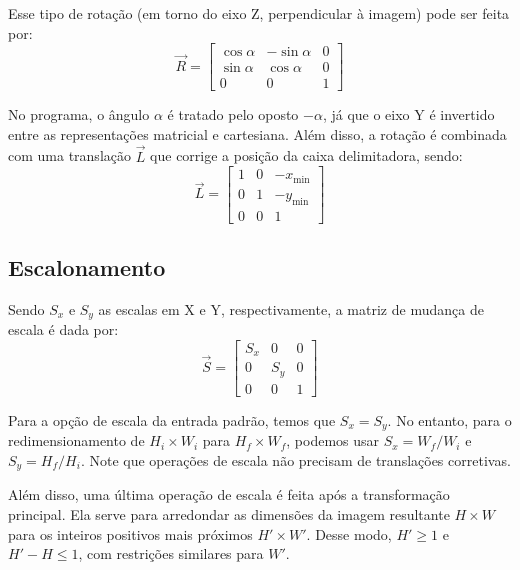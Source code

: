     Esse tipo de rotação (em torno do eixo Z, perpendicular à imagem) pode ser feita por:
    \[
        \vec{R} = \begin{bmatrix}
            \cos\alpha & -\sin\alpha & 0 \\
            \sin\alpha & \cos\alpha & 0 \\
            0 & 0 & 1
        \end{bmatrix}
    \]

    No programa, o ângulo $\alpha$ é tratado pelo oposto $-\alpha$, já que o eixo Y é invertido entre as representações matricial e cartesiana. Além disso, a rotação é combinada com uma translação $\vec{L}$ que corrige a posição da caixa delimitadora, sendo:
    \[
        \vec{L} = \begin{bmatrix}
            1 & 0 & -x_{\min} \\
            0 & 1 & -y_{\min} \\
            0 & 0 & 1
        \end{bmatrix}
    \]

\subsection{Escalonamento}

    Sendo $S_x$ e $S_y$ as escalas em X e Y, respectivamente, a matriz de mudança de escala é dada por:
    \[
        \vec{S} = \begin{bmatrix}
            S_x & 0 & 0 \\
            0 & S_y & 0 \\
            0 & 0 & 1
        \end{bmatrix}
    \]

    Para a opção de escala da entrada padrão, temos que $S_x = S_y$. No entanto, para o redimensionamento de $H_i \times W_i$ para $H_f \times W_f$, podemos usar $S_x = W_f / W_i$ e $S_y = H_f / H_i$. Note que operações de escala não precisam de translações corretivas.

    Além disso, uma última operação de escala é feita após a transformação principal. Ela serve para arredondar as dimensões da imagem resultante $H \times W$ para os inteiros positivos mais próximos $H' \times W'$. Desse modo, $H' \geq 1$ e $H' - H \leq 1$, com restrições similares para $W'$.
